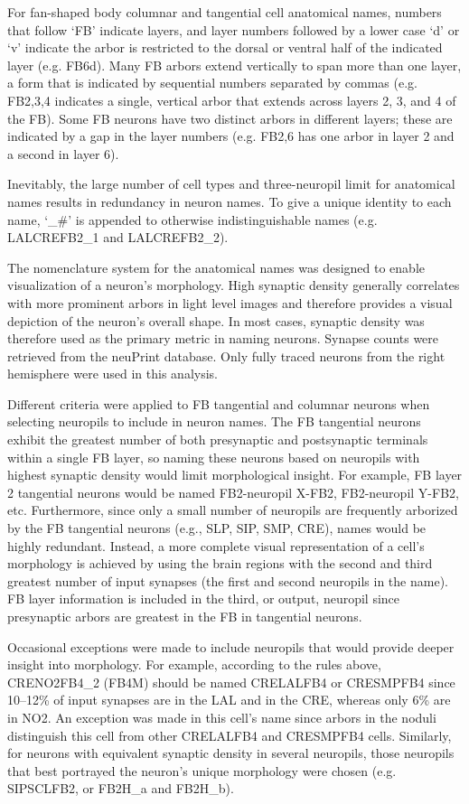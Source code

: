 \documentclass{article}
\begin{document}
For fan-shaped body columnar and tangential cell anatomical names, numbers that follow ‘FB’ indicate layers, and layer numbers followed by a lower case ‘d’ or ‘v’ indicate the arbor is restricted to the dorsal or ventral half of the indicated layer (e.g. FB6d). Many FB arbors extend vertically to span more than one layer, a form that is indicated by sequential numbers separated by commas (e.g. FB2,3,4 indicates a single, vertical arbor that extends across layers 2, 3, and 4 of the FB). Some FB neurons have two distinct arbors in different layers; these are indicated by a gap in the layer numbers (e.g. FB2,6 has one arbor in layer 2 and a second in layer 6).

Inevitably, the large number of cell types and three-neuropil limit for anatomical names results in redundancy in neuron names. To give a unique identity to each name, ‘\_\#’ is appended to otherwise indistinguishable names (e.g. LALCREFB2\_1 and LALCREFB2\_2).

The nomenclature system for the anatomical names was designed to enable visualization of a neuron’s morphology. High synaptic density generally correlates with more prominent arbors in light level images and therefore provides a visual depiction of the neuron’s overall shape. In most cases, synaptic density was therefore used as the primary metric in naming neurons. Synapse counts were retrieved from the neuPrint database. Only fully traced neurons from the right hemisphere were used in this analysis.

Different criteria were applied to FB tangential and columnar neurons when selecting neuropils to include in neuron names. The FB tangential neurons exhibit the greatest number of both presynaptic and postsynaptic terminals within a single FB layer, so naming these neurons based on neuropils with highest synaptic density would limit morphological insight. For example, FB layer 2 tangential neurons would be named FB2-neuropil X-FB2, FB2-neuropil Y-FB2, etc. Furthermore, since only a small number of neuropils are frequently arborized by the FB tangential neurons (e.g., SLP, SIP, SMP, CRE), names would be highly redundant. Instead, a more complete visual representation of a cell’s morphology is achieved by using the brain regions with the second and third greatest number of input synapses (the first and second neuropils in the name). FB layer information is included in the third, or output, neuropil since presynaptic arbors are greatest in the FB in tangential neurons.

Occasional exceptions were made to include neuropils that would provide deeper insight into morphology. For example, according to the rules above, CRENO2FB4\_2 (FB4M) should be named CRELALFB4 or CRESMPFB4 since 10–12\% of input synapses are in the LAL and in the CRE, whereas only 6\% are in NO2. An exception was made in this cell’s name since arbors in the noduli distinguish this cell from other CRELALFB4 and CRESMPFB4 cells. Similarly, for neurons with equivalent synaptic density in several neuropils, those neuropils that best portrayed the neuron’s unique morphology were chosen (e.g. SIPSCLFB2, or FB2H\_a and FB2H\_b).
\end{document}
